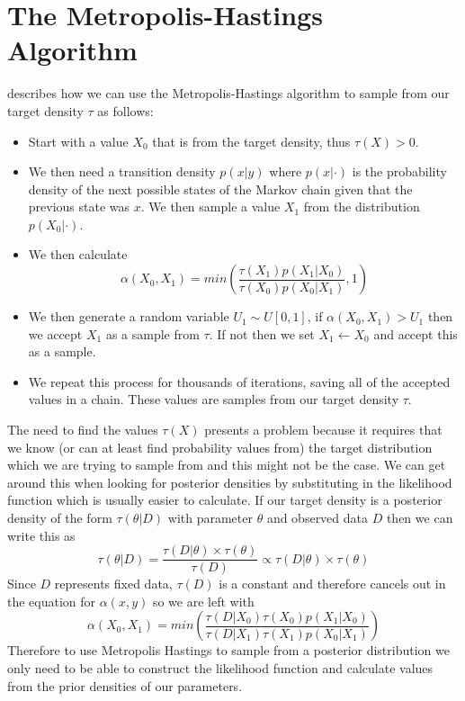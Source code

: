 \documentclass[11pt,a4paper]{report}
\begin{document}
\section{The Metropolis-Hastings Algorithm}
\citet{Voss14} describes how we can use the Metropolis-Hastings algorithm to sample from our target density $\tau$ as follows:
\begin{itemize}
\item Start with a value $X_0$ that is from the target density, thus $\tau(X) > 0$.
\item We then need a transition density $p(x|y)$ where $p(x | \cdot)$ is the probability density of the next possible states of the Markov chain given that the previous state was $x$. We then sample a value $X_1$ from the distribution $p(X_0|\cdot)$.
\item We then calculate 
\begin{equation}
\alpha(X_0,X_1) = min\left(\frac{\tau(X_1)p(X_1|X_0)}{\tau(X_0)p(X_0|X_1)},1\right)
\end{equation}
\item We then generate a random variable $U_1 \sim U[0,1]$, if $\alpha(X_0,X_1) > U_1$ then we accept $X_1$ as a sample from $\tau$. If not then we set $X_1 \leftarrow X_0$ and accept this as a sample.
\item We repeat this process for thousands of iterations, saving all of the accepted values in a chain. These values are samples from our target density $\tau$.
\end{itemize}
The need to find the values $\tau(X)$ presents a problem because it requires that we know (or can at least find probability values from) the target distribution which we are trying to sample from and this might not be the case. We can get around this when looking for posterior densities by substituting in the likelihood function which is usually easier to calculate. If our target density is a posterior density of the form $\tau(\theta | D)$ with parameter $\theta$ and observed data $D$ then we can write this as
\begin{equation}
\tau(\theta | D) = \frac{\tau(D | \theta) \times \tau(\theta)}{\tau(D)} \propto \tau(D | \theta) \times \tau(\theta)
\end{equation}
Since $D$ represents fixed data, $\tau(D)$ is a constant and therefore cancels out in the equation for $\alpha(x,y)$ so we are left with
\begin{equation}
\alpha(X_0,X_1) = min\left(\frac{\tau(D | X_0)\tau(X_0)p(X_1|X_0)}{\tau(D | X_1)\tau(X_1)p(X_0|X_1)}\right)
\end{equation}
Therefore to use Metropolis Hastings to sample from a posterior distribution we only need to be able to construct the likelihood function and calculate values from the prior densities of our parameters.
\end{document}
